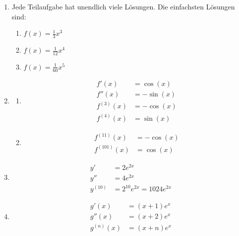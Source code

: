 \begin{enumerate}
\begin{enumerate}
\begin{enumerate}
			                  \begin{align*}
				                  f'(x)      & = 6x^5   \\
				                  f''(x)     & = 30x^4  \\
				                  f^{(3)}(x) & = 120x^3 \\
				                  f^{(4)}(x) & = 360x^2 \\
				                  f^{(5)}(x) & = 720x
			                  \end{align*}
		            \end{enumerate}
		      \item \( f^{(5)}(x) = n(n-1)(n-2)(n-3)(n-4)x^{n-5} \)
		      \item Ja.
	      \end{enumerate}

	\item  Jede Teilaufgabe hat unendlich viele Lösungen. Die einfachsten Lösungen sind:
	      \begin{enumerate}
		      \item \( f(x) = \frac{1}{3}x^3\)
		      \item \( f(x) = \frac{1}{12}x^4  \)
		      \item \( f(x) = \frac{1}{60}x^5  \)
	      \end{enumerate}

	\item
	      \begin{enumerate}
		      \item
		            \begin{align*}
			            f'(x)      & = \cos(x)  \\
			            f''(x)     & = -\sin(x) \\
			            f^{(3)}(x) & = -\cos(x) \\
			            f^{(4)}(x) & = \sin(x)
		            \end{align*}
		      \item
		            \begin{align*}
			            f^{(11)}(x)  & = -\cos(x) \\
			            f^{(101)}(x) & = \cos(x)
		            \end{align*}
	      \end{enumerate}

	\item
	      \begin{align*}
		      y'       & = 2e^{2x}                   \\
		      y''      & = 4e^{2x}                   \\
		      y^{(10)} & = 2^{10}e^{2x} = 1024e^{2x}
	      \end{align*}

	\item
	      \begin{align*}
		      g'(x)      & =(x+1) e^x  \\
		      g''(x)     & = (x+2) e^x \\
		      g^{(n)}(x) & = (x+n)e^x
	      \end{align*}
\end{enumerate}
